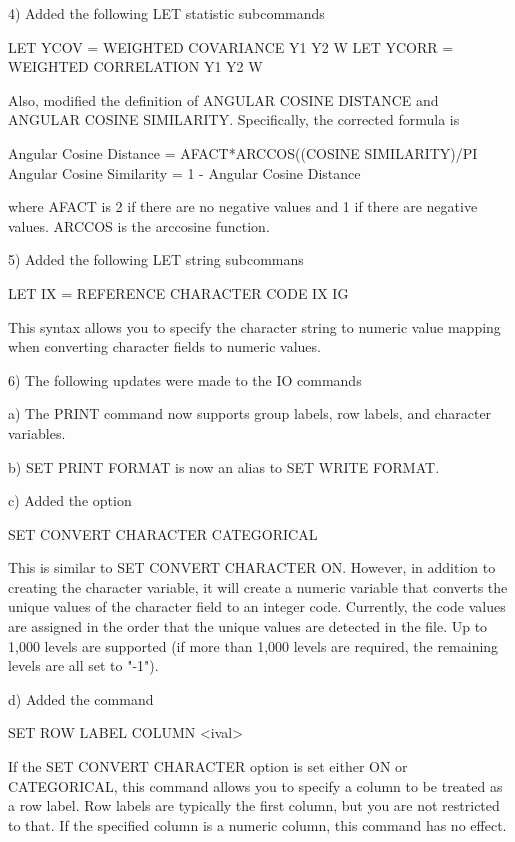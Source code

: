  4) Added the following LET statistic subcommands

      LET YCOV  = WEIGHTED COVARIANCE  Y1 Y2 W
      LET YCORR = WEIGHTED CORRELATION Y1 Y2 W

    Also, modified the definition of ANGULAR COSINE DISTANCE and
    ANGULAR COSINE SIMILARITY.  Specifically, the corrected formula is

      Angular Cosine Distance = AFACT*ARCCOS((COSINE SIMILARITY)/PI
      Angular Cosine Similarity = 1 - Angular Cosine Distance

    where AFACT is 2 if there are no negative values and 1 if there
    are negative values.  ARCCOS is the arccosine function.

 5) Added the following LET string subcommans

       LET IX = REFERENCE CHARACTER CODE IX IG

    This syntax allows you to specify the character string to numeric
    value mapping when converting character fields to numeric values.

 6) The following updates were made to the IO commands

    a) The PRINT command now supports group labels, row labels, and
       character variables.

    b) SET PRINT FORMAT is now an alias to SET WRITE FORMAT.

    c) Added the option

         SET CONVERT CHARACTER CATEGORICAL

       This is similar to SET CONVERT CHARACTER ON.  However, in
       addition to creating the character variable, it will create
       a numeric variable that converts the unique values of the
       character field to an integer code.  Currently, the code values
       are assigned in the order that the unique values are detected
       in the file.  Up to 1,000 levels are supported (if more than
       1,000 levels are required, the remaining levels are all set
       to "-1").

    d) Added the command

         SET ROW LABEL COLUMN <ival>

       If the SET CONVERT CHARACTER option is set either ON or
       CATEGORICAL, this command allows you to specify a column to be
       treated as a row label.  Row labels are typically the first
       column, but you are not restricted to that.  If the specified
       column is a numeric column, this command has no effect.

